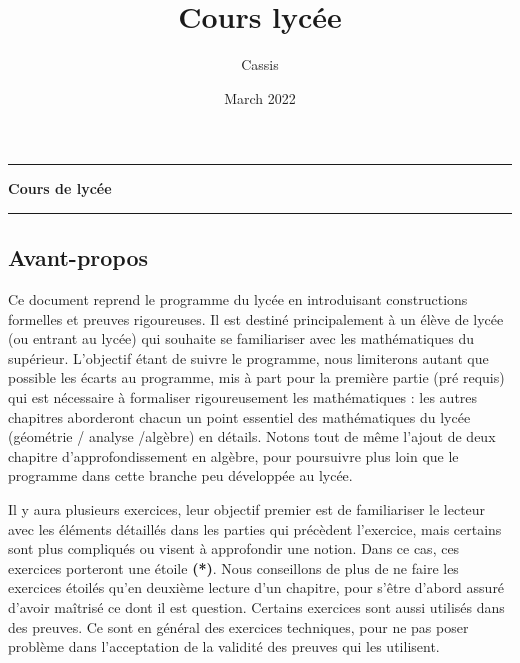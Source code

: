 \documentclass[11pt,french]{article}
\title{Cours lycée}
\author{Cassis}
\date{March 2022}
\theoremstyle{definition}
\theoremstyle{plain}
\theoremstyle{remark}
\begin{document}
\setlength{\unitlength}{1cm}

\date{}

\thispagestyle{empty}

\vspace{0.5cm}

\begin{center}

	\vspace{1.5cm}

	\rule[11pt]{6cm}{0.5pt}

	\textbf{\huge Cours de lycée}

	\vspace{0.2cm}

	\text{}

	\vspace{0.2cm}



	\rule{6cm}{0.5pt}

	\vspace{1cm}

\end{center}

\subsection*{Avant-propos}

Ce document reprend le programme du lycée en introduisant constructions formelles et preuves rigoureuses. Il est destiné principalement à un élève de lycée (ou entrant au lycée) qui souhaite se familiariser avec les mathématiques du supérieur. L'objectif étant de suivre le programme, nous limiterons autant que possible les écarts au programme, mis à part pour la première partie (pré requis) qui est nécessaire à formaliser rigoureusement les mathématiques : les autres chapitres aborderont chacun un point essentiel des mathématiques du lycée (géométrie / analyse /algèbre) en détails. Notons tout de même l'ajout de deux chapitre d'approfondissement en algèbre, pour poursuivre plus loin que le programme dans cette branche peu développée au lycée.

Il y aura plusieurs exercices, leur objectif premier est de familiariser le lecteur avec les éléments détaillés dans les parties qui précèdent l'exercice, mais certains sont plus compliqués ou visent à approfondir une notion. Dans ce cas, ces exercices porteront une étoile \textbf{(*)}. Nous conseillons de plus de ne faire les exercices étoilés qu'en deuxième lecture d'un chapitre, pour s'être d'abord assuré d'avoir maîtrisé ce dont il est question. Certains exercices sont aussi utilisés dans des preuves. Ce sont en général des exercices techniques, pour ne pas poser problème dans l'acceptation de la validité des preuves qui les utilisent.
\end{document}
